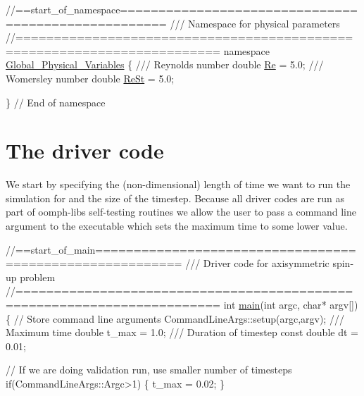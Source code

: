  
\begin{DoxyCodeInclude}
\textcolor{comment}{//==start\_of\_namespace====================================================}
\textcolor{comment}{/// Namespace for physical parameters}
\textcolor{comment}{}\textcolor{comment}{//========================================================================}
\textcolor{keyword}{namespace }\hyperlink{namespaceGlobal__Physical__Variables}{Global\_Physical\_Variables}
\{
\textcolor{comment}{}
\textcolor{comment}{ /// Reynolds number}
\textcolor{comment}{} \textcolor{keywordtype}{double} \hyperlink{namespaceGlobal__Physical__Variables_ab814e627d2eb5bc50318879d19ab16b9}{Re} = 5.0;
\textcolor{comment}{}
\textcolor{comment}{ /// Womersley number}
\textcolor{comment}{} \textcolor{keywordtype}{double} \hyperlink{namespaceGlobal__Physical__Variables_a085ee4bf968ffdd01a41b8c41864f907}{ReSt} = 5.0;

\} \textcolor{comment}{// End of namespace}

\end{DoxyCodeInclude}




 

\hypertarget{index_main}{}\section{The driver code}\label{index_main}
We start by specifying the (non-\/dimensional) length of time we want to run the simulation for and the size of the timestep. Because all driver codes are run as part of {\ttfamily oomph-\/lib\textquotesingle{}s} self-\/testing routines we allow the user to pass a command line argument to the executable which sets the maximum time to some lower value.


\begin{DoxyCodeInclude}
\textcolor{comment}{//==start\_of\_main=========================================================}
\textcolor{comment}{/// Driver code for axisymmetric spin-up problem}
\textcolor{comment}{}\textcolor{comment}{//========================================================================}
\textcolor{keywordtype}{int} \hyperlink{spin__up_8cc_a0ddf1224851353fc92bfbff6f499fa97}{main}(\textcolor{keywordtype}{int} argc, \textcolor{keywordtype}{char}* argv[])
\{
 \textcolor{comment}{// Store command line arguments}
 CommandLineArgs::setup(argc,argv);
\textcolor{comment}{}
\textcolor{comment}{ /// Maximum time}
\textcolor{comment}{} \textcolor{keywordtype}{double} t\_max = 1.0;
\textcolor{comment}{}
\textcolor{comment}{ /// Duration of timestep}
\textcolor{comment}{} \textcolor{keyword}{const} \textcolor{keywordtype}{double} dt = 0.01;

 \textcolor{comment}{// If we are doing validation run, use smaller number of timesteps}
 \textcolor{keywordflow}{if}(CommandLineArgs::Argc>1) \{ t\_max = 0.02; \}

\end{DoxyCodeInclude}


